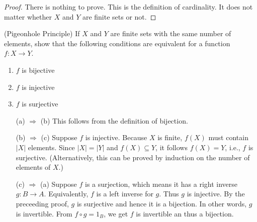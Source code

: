 \begin{questions}
\begin{proof} There is nothing to prove. This is the definition of cardinality. It does not matter whether \(X\) and \(Y\) are finite sets or not.
\end{proof}


\question
    (Pigeonhole Principle)
    If \(X\) and \(Y\) are finite sets with the same number of elements, show that the following conditions are equivalent for a function \(f\colon X \rightarrow Y\).
    \begin{enumerate}[label=(\alph*)]
        \item \(f\) is bijective
        \item \(f\) is injective
        \item \(f\) is surjective
    \end{enumerate}
\begin{theproof} \hfill
\begin{itemize}[left=0.7in]
    \item[(a) \(\Rightarrow\) (b)] This follows from the definition of bijection.
    
    \item[(b) \(\Rightarrow\) (c)] Suppose \(f\) is injective. 
    Because \(X\) is finite, \(f(X)\) must contain   \(|X|\) elements.
    Since \(|X| = |Y|\) and \(f(X)\subseteq Y\), it follows  \(f(X) = Y\), i.e., \(f\) is surjective.
    (Alternatively, this can be proved by induction on the number of elements of \(X\).)
    
    \item[(c) \(\Rightarrow\) (a)] Suppose \(f\) is a surjection, which means it has a right inverse \(g\colon B\to A\). 
    Equivalently,  \(f\) is a left inverse for \(g\). 
    Thus \(g\) is injective. By the preceeding proof, \(g\) is surjective and hence it is a bijection. In other words, \(g\) is invertible.
    From \(f\circ g = 1_B\), we get \(f\)  is invertible an thus a bijection.
\end{itemize}


\end{theproof}
\end{questions}
